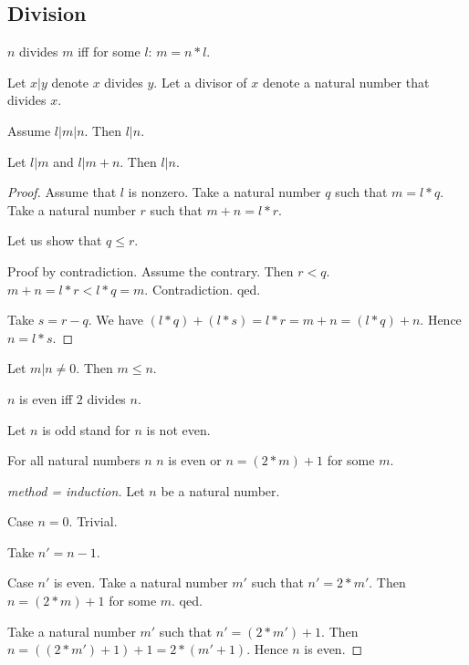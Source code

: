 \documentclass[english,11pt]{article}
\begin{document}
\subsection{Division}

\begin{forthel}

\begin{definition}
$n$ divides $m$ iff for some $l$: $m = n * l$.
\end{definition}

Let $x | y$ denote $x$ divides $y$.
Let a divisor of $x$ denote a natural number that divides $x$.

\begin{lemma}
Assume $l | m | n$.
Then $l | n$.
\end{lemma}

\begin{lemma}
Let $l | m$ and $l | m + n$.
Then $l | n$.
\end{lemma}
\begin{proof}
Assume that $l$ is nonzero.
Take a natural number $q$ such that $m = l * q$.
Take a natural number $r$ such that $m + n = l * r$.

Let us show that
$q \leq r$.

Proof by contradiction.
Assume the contrary. Then $r < q$.
$m+n = l * r < l * q = m$.
Contradiction. qed.

Take $s = r - q$.
We have $(l * q) + (l * s) = l * r = m + n = (l * q) + n$.
Hence $n = l * s$.
\end{proof}

\begin{lemma}
Let $m | n \neq 0$.
Then $m \leq n$.
\end{lemma}

\begin{definition} $n$ is even iff $2$ divides $n$.
\end{definition}

Let $n$ is odd stand for $n$ is not even.

\begin{lemma}
For all natural numbers $n$ $n$ is even or $n = (2 * m) + 1$ for some $m$.
\end{lemma}
\begin{proof}[method = induction]
Let $n$ be a natural number.

Case $n = 0$. Trivial.

Take $n' = n - 1$.

Case $n'$ is even. Take a natural number $m'$ such that $n' = 2 * m'$.
Then $n = (2 * m) + 1$ for some $m$. qed.

Take a natural number $m'$ such that $n' = (2 * m') + 1$.
Then $n = ((2 * m') + 1) + 1 = 2 * (m' + 1)$.
Hence $n$ is even.

\end{proof}

\end{forthel}
\end{document}

